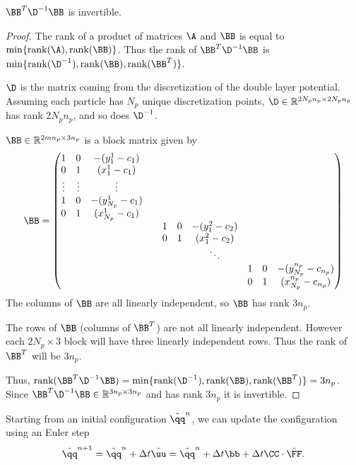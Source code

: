 \begin{claim*} 
$\BB^T \D^{-1}\BB$ is invertible.
\begin{proof}

The rank of a product of matrices $\A$ and $\BB$ is equal to $\min\{\text{rank}(\A), \text{rank}(\BB)\}$. Thus the rank of $\BB^T \D^{-1}\BB$ is $\min\{\text{rank}(\D^{-1}), \text{rank}(\BB), \text{rank}(\BB^T)\}$. 

$\D$ is the matrix coming from the discretization of the double layer potential. Assuming each particle has $N_p$ unique discretization points, $\D \in \mathbb{R}^{2N_p n_p\times 2N_p n_p}$ has rank $2N_p n_p$, and so does $\D^{-1}$.  

$\BB\in \mathbb{R}^{2mn_p\times 3n_p}$ is a block matrix given by
	\[ \BB = \begin{pmatrix} 1 & 0 & -(y^1_1 - c_1)  & & & & &\\
				0 & 1 & (x^1_1 - c_1)& & & & & \\
				\vdots & \vdots & \vdots & & & & & &\\
				1 & 0 & -(y^1_{N_p}- c_1)& & & & & & \\
				0 & 1 & (x^1_{N_p} - c_1) & & & & & &\\
				& & & & 1 & 0 & -(y^2_1 - c_2) & &  \\
				& & & & 0 & 1 & (x^2_1 - c_2) & &  \\
				& & & & & & \ddots  & &  \\
				& & & & & & & 1 & 0 & -(y^{n_p}_{N_p} - c_{n_p})\\
				& & & & & & & 0 & 1 & (x^{n_p}_{N_p} - c_{n_p})\end{pmatrix}\]
The columns of $\BB$ are all linearly independent, so $\BB$ has rank $3n_p$.

The rows of $\BB$ (columns of $\BB^T$) are not all linearly independent. However each  $2N_p\times3$ block will have three linearly independent rows. Thus the rank of $\BB^T$ will be  $3n_p$.  \

Thus, $\text{rank}(\BB^T \D^{-1}\BB) = \min\{\text{rank}(\D^{-1}), \text{rank}(\BB), \text{rank}(\BB^T)\} = 3n_p$. Since  $\BB^T \D^{-1}\BB \in \mathbb{R}^{3n_p\times 3n_p}$ and has rank $3n_p$ it is invertible.
\end{proof}
\end{claim*}

Starting from an initial configuration $\hat{\qq}^n$, we can update the configuration using an Euler step
\[ \hat{\qq}^{n+1} = \hat{\qq}^n + \Delta t \hat{\uu} = \hat{\qq}^n + \Delta t\bb + \Delta t \CC\cdot\hat{\FF}.\]

